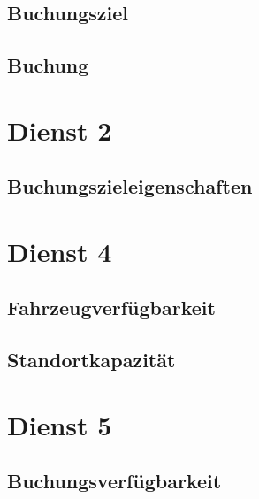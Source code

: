 \subsection*{Buchungsziel}



\subsection*{Buchung}



\section{Dienst 2}
\label{sec:Datenmodell:Dienst2}

\subsection*{Buchungszieleigenschaften}




\section{Dienst 4}
\label{sec:Datenmodell:Dienst4}

\subsection*{Fahrzeugverfügbarkeit}



\subsection*{Standortkapazität}



\section{Dienst 5}
\label{sec:Datenmodell:Dienst5}

\subsection*{Buchungsverfügbarkeit}



